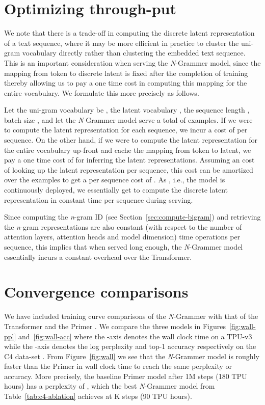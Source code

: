 \documentclass[11pt]{article}
\begin{document}
\section{Optimizing through-put}
We note that there is a trade-off in computing the discrete 
latent representation of a text sequence, 
where it may be more efficient in practice to cluster the 
uni-gram vocabulary directly rather than clustering the 
embedded text sequence. This is an important consideration 
when serving the \textit{N}-Grammer model, since the mapping 
from token to discrete latent is fixed after the completion
of training thereby allowing us to pay a one time cost
in computing this mapping for the entire vocabulary. 
We formulate this more precisely as follows.

Let the uni-gram vocabulary be , the latent vocabulary
, the sequence length , batch size ,
and let the  \textit{N}-Grammer model serve a 
total of  examples. 
If we were to compute the latent representation for each
sequence, we incur a cost of  per sequence. 
On the other hand, if we were to compute
the latent representation for the entire vocabulary up-front
and cache the mapping from token to latent, we pay a one time 
cost of  for inferring the latent representations. 
Assuming an  cost of looking up the latent 
representation per sequence, this
cost can be amortized over the  examples to get a per 
sequence cost of . As ,
i.e., the model is continuously deployed, 
we essentially get to compute the discrete latent 
representation in constant time per sequence during serving.

Since computing the \textit{n}-gram ID (see 
Section~\ref{sec:compute-bigram})
and retrieving the \textit{n}-gram
representations are also constant (with respect to the
number of attention layers, attention 
heads and model dimension)
time operations per sequence, this implies that when
served long enough, 
the \textit{N}-Grammer model essentially incurs a 
constant overhead over the Transformer.

\section{Convergence comparisons}
We have included training curve comparisons of the \textit{N}-Grammer with that of
the Transformer \citep{vaswani2017attention} and the Primer \citep{so2021primer}. We compare the
three models in Figures~\ref{fig:wall-ppl} 
and~\ref{fig:wall-acc} where the -axis denotes the wall clock
time on a TPU-v3 while the -axis denotes the log perplexity and top-1 accuracy respectively
on the C4 data-set \citep{raffel2019exploring}. 
From Figure~\ref{fig:wall} we see that the 
\textit{N}-Grammer model is roughly  faster than the Primer in wall clock time to reach
the same perplexity or accuracy. More precisely, the
baseline Primer model after 1M steps (180 TPU hours)
has a perplexity of
, which the 
best \textit{N}-Grammer model from Table~\ref{tab:c4-ablation}
achieves at K steps (90 TPU hours).
\end{document}
